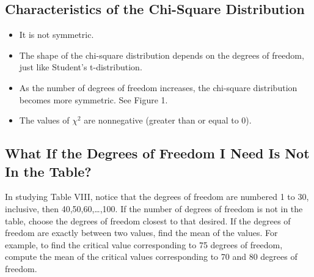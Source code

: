 \documentclass{report}
\begin{document}
    \subsection*{Characteristics of the Chi-Square Distribution}
    \bigbreak \noindent 
        \begin{itemize}
        \item It is not symmetric.
        \item The shape of the chi-square distribution depends on the degrees of freedom, just like Student's t-distribution.
        \item As the number of degrees of freedom increases, the chi-square distribution becomes more symmetric. See Figure 1.
        \item The values of $\chi^2$ are nonnegative (greater than or equal to 0).
    \end{itemize}
    \bigbreak \noindent 

    \bigbreak \noindent \bigbreak \noindent 
    \subsection*{What If the Degrees of Freedom I Need Is Not In the Table?}
    \bigbreak \noindent 
      In studying Table VIII, notice that the degrees of freedom are numbered 1 to 30, inclusive, then 40,50,60,…,100. If the number of degrees of freedom is not in the table, choose the degrees of freedom closest to that desired. If the degrees of freedom are exactly between two values, find the mean of the values.
    \bigbreak \noindent 
    For example, to find the critical value corresponding to 75 degrees of freedom, compute the mean of the critical values corresponding to 70 and 80 degrees of freedom.


    \pagebreak 
\end{document}
